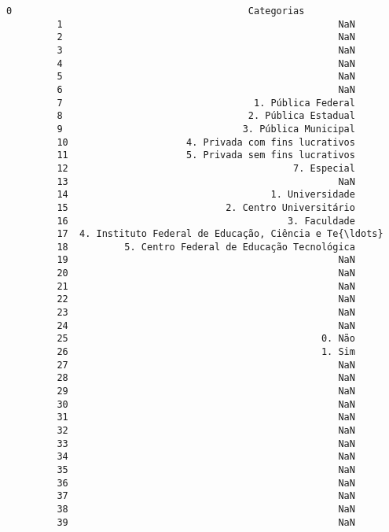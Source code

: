 \documentclass[11pt]{article}
\begin{document}
\begin{Verbatim}[commandchars=\\\{\}]
         0                                          Categorias  
         1                                                 NaN  
         2                                                 NaN  
         3                                                 NaN  
         4                                                 NaN  
         5                                                 NaN  
         6                                                 NaN  
         7                                  1. Pública Federal  
         8                                 2. Pública Estadual  
         9                                3. Pública Municipal  
         10                     4. Privada com fins lucrativos  
         11                     5. Privada sem fins lucrativos  
         12                                        7. Especial  
         13                                                NaN  
         14                                    1. Universidade  
         15                            2. Centro Universitário  
         16                                       3. Faculdade  
         17  4. Instituto Federal de Educação, Ciência e Te{\ldots}  
         18          5. Centro Federal de Educação Tecnológica  
         19                                                NaN  
         20                                                NaN  
         21                                                NaN  
         22                                                NaN  
         23                                                NaN  
         24                                                NaN  
         25                                             0. Não  
         26                                             1. Sim  
         27                                                NaN  
         28                                                NaN  
         29                                                NaN  
         30                                                NaN  
         31                                                NaN  
         32                                                NaN  
         33                                                NaN  
         34                                                NaN  
         35                                                NaN  
         36                                                NaN  
         37                                                NaN  
         38                                                NaN  
         39                                                NaN  

\end{Verbatim}
\end{document}
